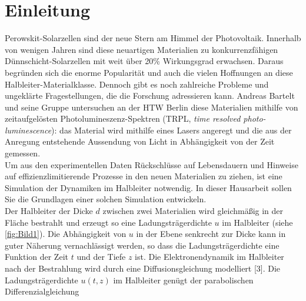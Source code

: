 \documentclass[
	pagesize,
	fontsize=12pt,
	paper=a4,
	oneside,
   reqno
]{scrartcl}
\begin{document}
\renewcommand{\contentsname}{Inhaltsverzeichnis}
\tableofcontents
\clearpage

\renewcommand{\listfigurename}{Abbildungsverzeichnis}
\renewcommand*{\figurename}{Abb.}
\listoffigures

\renewcommand*{\listtablename}{Tabellenverzeichnis}
\renewcommand*{\tablename}{Tab.}
\listoftables
\clearpage



\section{Einleitung}

Perowskit-Solarzellen sind der neue Stern am Himmel der Photovoltaik. Innerhalb von wenigen Jahren sind diese neuartigen Materialien zu konkurrenzfähigen Dünnschicht-Solarzellen mit weit über 20\% Wirkungsgrad erwachsen. Daraus begründen sich die enorme Popularität und auch die vielen Hoffnungen an diese Halbleiter-Materialklasse. Dennoch gibt es noch zahlreiche Probleme und ungeklärte Fragestellungen, die die Forschung adressieren kann. Andreas Bartelt und seine Gruppe untersuchen an der HTW Berlin diese Materialien mithilfe von zeitaufgelösten Photolumineszenz-Spektren (TRPL, \textit{time resolved photo-
luminescence}): das Material wird mithilfe eines Lasers angeregt und die aus der Anregung entstehende Aussendung von Licht in Abhängigkeit von der Zeit gemessen. \\
Um aus den experimentellen Daten Rückschlüsse auf Lebensdauern und Hinweise auf effizienzlimitierende Prozesse in den neuen Materialien zu ziehen, ist eine Simulation der Dynamiken im Halbleiter notwendig. In dieser Hausarbeit sollen Sie die Grundlagen einer solchen Simulation entwickeln. \\
Der Halbleiter der Dicke $d$ zwischen zwei Materialien wird gleichmäßig in der Fläche bestrahlt und erzeugt so eine Ladungsträgerdichte $u$ im Halbleiter (siehe \autoref{fig:Bild1}). Die Abhängigkeit von $u$ in der Ebene senkrecht zur Dicke kann in guter Näherung vernachlässigt werden, so dass die Ladungsträgerdichte eine
Funktion der Zeit $t$ und der Tiefe $z$ ist. Die Elektronendynamik im Halbleiter nach der Bestrahlung wird durch eine Diffusionsgleichung modelliert [3]. Die Ladungsträgerdichte $u(t,z)$ im Halbleiter genügt der parabolischen Differenzialgleichung
\end{document}
